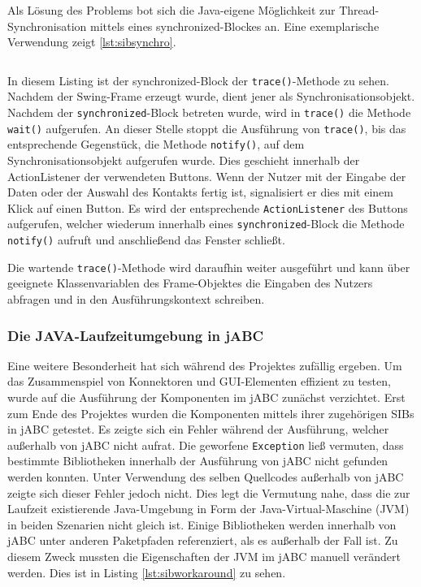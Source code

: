 Als Lösung des Problems bot sich die Java-eigene Möglichkeit zur Thread-Synchronisation mittels eines synchronized-Blockes an.
Eine exemplarische Verwendung zeigt \autoref{lst:sibsynchro}.

\begin{lstlisting}[float=h!t]

\end{lstlisting}

In diesem Listing ist der synchronized-Block der \lstinline{trace()}-Methode zu sehen.
Nachdem der Swing-Frame erzeugt wurde, dient jener als Synchronisationsobjekt.
Nachdem der \lstinline{synchronized}-Block betreten wurde, wird in \lstinline{trace()} die Methode \lstinline{wait()} aufgerufen.
An dieser Stelle stoppt die Ausführung von \lstinline{trace()}, bis das entsprechende Gegenstück, die Methode \lstinline{notify()},
 auf dem Synchronisationsobjekt aufgerufen wurde.
Dies geschieht innerhalb der ActionListener der verwendeten Buttons.
Wenn der Nutzer mit der Eingabe der Daten oder der Auswahl des Kontakts fertig ist, signalisiert er dies mit einem
 Klick auf einen Button.
Es wird der entsprechende \lstinline{ActionListener} des Buttons aufgerufen, welcher wiederum innerhalb eines
 \lstinline{synchronized}-Block die Methode \lstinline{notify()} aufruft und anschließend das Fenster schließt.

Die wartende \lstinline{trace()}-Methode wird daraufhin weiter ausgeführt und kann über geeignete Klassenvariablen
 des Frame-Objektes die Eingaben des Nutzers abfragen und in den Ausführungskontext schreiben.
\FloatBarrier
\subsubsection{Die JAVA-Laufzeitumgebung in jABC}	
Eine weitere Besonderheit hat sich während des Projektes zufällig ergeben.
Um das Zusammenspiel von Konnektoren und GUI-Elementen effizient zu testen, wurde auf die Ausführung der
 Komponenten im jABC zunächst verzichtet.
Erst zum Ende des Projektes wurden die Komponenten mittels ihrer zugehörigen SIBs in jABC getestet.
Es zeigte sich ein Fehler während der Ausführung, welcher außerhalb von jABC nicht aufrat.
Die geworfene \lstinline{Exception} ließ vermuten, dass bestimmte Bibliotheken innerhalb der Ausführung von jABC nicht
 gefunden werden konnten.
Unter Verwendung des selben Quellcodes außerhalb von jABC zeigte sich dieser Fehler jedoch nicht.
Dies legt die Vermutung nahe, dass die zur Laufzeit existierende Java-Umgebung in Form der Java-Virtual-Maschine (JVM)
 in beiden Szenarien nicht gleich ist.
Einige Bibliotheken werden innerhalb von jABC unter anderen Paketpfaden referenziert, als es außerhalb der Fall ist.
Zu diesem Zweck mussten die Eigenschaften der JVM im jABC manuell verändert werden. Dies ist in Listing \ref{lst:sibworkaround}
 zu sehen.

